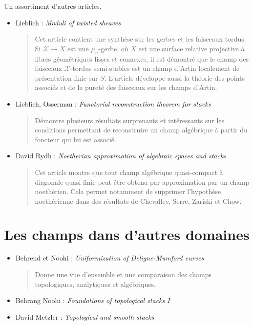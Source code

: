 \noindent
Un assortiment d'autres articles.
\begin{itemize}
\item Lieblich : \emph{Moduli of twisted sheaves} \cite{lieblich_twisted}
\begin{quote}
Cet article contient une synthèse sur les gerbes et les faisceaux tordus.
Si $\mathcal{X} \rightarrow X$ est une $\mu_n$-gerbe, où $X$ est une surface
relative projective à fibres géométriques lisses et connexes, il est démontré
que le champ des faisceaux $\mathcal{X}$-tordus semi-stables est un champ
d'Artin localement de présentation finie sur $S$. L'article développe aussi
la théorie des points associés et de la pureté des faisceaux sur les champs
d'Artin.
\end{quote}
\item Lieblich, Osserman :
\emph{Functorial reconstruction theorem for stacks}
\cite{lieblich-osserman}
\begin{quote}
Démontre plusieurs résultats surprenants et intéressants sur les conditions
permettant de reconstruire un champ algébrique à partir du foncteur qui lui
est associé.
\end{quote}
\item David Rydh :
\emph{Noetherian approximation of algebraic spaces and stacks}
\cite{rydh_approx}
\begin{quote}
Cet article montre que tout champ algébrique quasi-compact à diagonale
quasi-finie peut être obtenu par approximation par un champ noethérien. Cela
permet notamment de supprimer l'hypothèse noethérienne dans des résultats de
Chevalley, Serre, Zariski et Chow.
\end{quote}
\end{itemize}



\section{Les champs dans d'autres domaines}
\label{section-stacks-areas}

\begin{itemize}
\item Behrend et Noohi : \emph{Uniformization of Deligne-Mumford curves}
\cite{behrend-noohi}
\begin{quote}
Donne une vue d'ensemble et une comparaison des champs topologiques,
analytiques et algébriques.
\end{quote}
\item Behrang Noohi : \emph{Foundations of topological stacks I} \cite{noohi}
\item David Metzler : \emph{Topological and smooth stacks} \cite{metzler}
\end{itemize}


